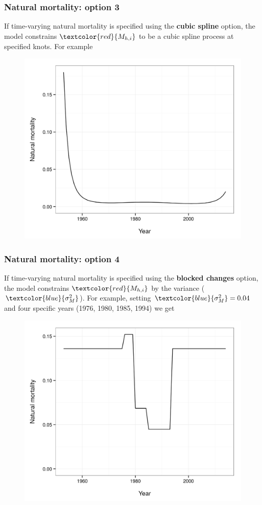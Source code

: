 \documentclass{beamer}
\begin{document}
\begin{frame}
\frametitle{Natural mortality: option 3}
If time-varying natural mortality is specified using the {\bf cubic spline}
option, the model constrains $\textcolor{red}{M_{h,i}}$ to be a cubic spline process at
specified knots. For example
\begin{figure}[!htbp]
  \centering
  \includegraphics[width=0.6\linewidth]{figure/M_t_spline.png}
\end{figure}
\end{frame}


\begin{frame}
\frametitle{Natural mortality: option 4}
If time-varying natural mortality is specified using the {\bf blocked changes}
option, the model constrains $\textcolor{red}{M_{h,i}}$ by the variance
($\textcolor{blue}{\sigma^2_M}$). For example, setting
$\textcolor{blue}{\sigma^2_M} = 0.04$ and four specific years (1976, 1980, 1985,
1994) we get
\begin{figure}[!htbp]
  \centering
  \includegraphics[width=0.6\linewidth]{figure/M_t_block.png}
\end{figure}
\end{frame}
\end{document}
